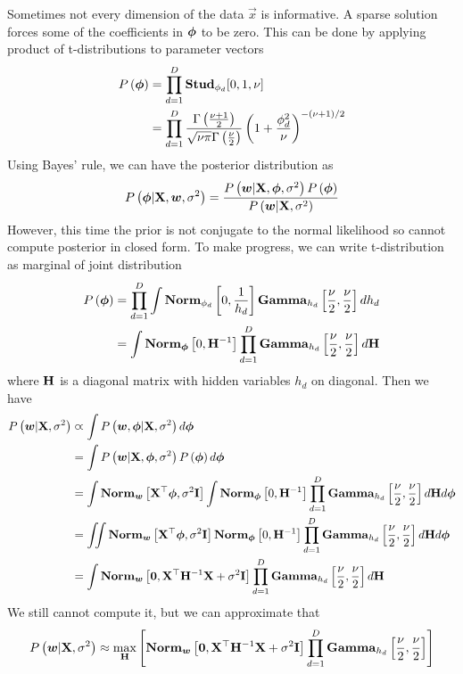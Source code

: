 Sometimes not every dimension of the data $\vec{x}$ is informative. A sparse solution forces some of the coefficients in $\boldsymbol{\phi}$ to be zero. This can be done by applying product of t-distributions to parameter vectors
\begin{align*}
	P\left(\boldsymbol{\phi}\right)&=\prod_{d=1}^D\mathbf{Stud}_{\phi_d}[0,1,\nu] \\
	&=\prod_{d=1}^D\frac{\Gamma\left(\frac{\nu+1}{2}\right)}{\sqrt{\nu\pi}\Gamma\left(\frac{\nu}{2}\right)}\left(1+\frac{\phi_d^2}{\nu}\right)^{-(\nu+1)/2}
\end{align*}
Using Bayes' rule, we can have the posterior distribution as
\begin{align*}
	P\left(\boldsymbol{\phi}|\mathbf{X},\boldsymbol{w},\sigma^2\right)=\frac{P\left(\boldsymbol{w}|\mathbf{X},\boldsymbol{\phi},\sigma^2\right)P\left(\boldsymbol{\phi}\right)}{P\left(\boldsymbol{w}|\mathbf{X},\sigma^2\right)}
\end{align*}
However, this time the prior is not conjugate to the normal likelihood so cannot compute posterior in closed form. To make progress, we can write t-distribution as marginal of joint distribution
\begin{align*}
	P\left(\boldsymbol{\phi}\right)&=\prod_{d=1}^D\int\mathbf{Norm}_{\phi_d}\left[0,\frac{1}{h_d}\right]\mathbf{Gamma}_{h_d}\left[\frac{\nu}{2},\frac{\nu}{2}\right]dh_d \\
	&=\int\mathbf{Norm}_{\boldsymbol{\phi}}\left[0,\mathbf{H}^{-1}\right]\prod_{d=1}^D\mathbf{Gamma}_{h_d}\left[\frac{\nu}{2},\frac{\nu}{2}\right]d\mathbf{H}
\end{align*}
where $\mathbf{H}$ is a diagonal matrix with hidden variables $h_d$ on diagonal. Then we have
\begin{align*}
	P\left(\boldsymbol{w}|\mathbf{X},\sigma^2\right)&\varpropto\int P\left(\boldsymbol{w},\boldsymbol{\phi}|\mathbf{X},\sigma^2\right)d\boldsymbol{\phi} \\
	&=\int P\left(\boldsymbol{w}|\mathbf{X},\boldsymbol{\phi},\sigma^2\right)P\left(\boldsymbol{\phi}\right)d\boldsymbol{\phi} \\
	&=\int\mathbf{Norm}_{\boldsymbol{w}}\left[\mathbf{X}^\top\boldsymbol{\phi},\sigma^2\mathbf{I}\right]\int\mathbf{Norm}_{\boldsymbol{\phi}}\left[0,\mathbf{H}^{-1}\right]\prod_{d=1}^D\mathbf{Gamma}_{h_d}\left[\frac{\nu}{2},\frac{\nu}{2}\right]d\mathbf{H}d\boldsymbol{\phi} \\
	&=\iint\mathbf{Norm}_{\boldsymbol{w}}\left[\mathbf{X}^\top\boldsymbol{\phi},\sigma^2\mathbf{I}\right]\mathbf{Norm}_{\boldsymbol{\phi}}\left[0,\mathbf{H}^{-1}\right]\prod_{d=1}^D\mathbf{Gamma}_{h_d}\left[\frac{\nu}{2},\frac{\nu}{2}\right]d\mathbf{H}d\boldsymbol{\phi} \\
	&=\int\mathbf{Norm}_{\boldsymbol{w}}\left[\boldsymbol{0},\mathbf{X}^\top\mathbf{H}^{-1}\mathbf{X}+\sigma^2\mathbf{I}\right]\prod_{d=1}^D\mathbf{Gamma}_{h_d}\left[\frac{\nu}{2},\frac{\nu}{2}\right]d\mathbf{H}
\end{align*}
We still cannot compute it, but we can approximate that
\begin{align*}
	P\left(\boldsymbol{w}|\mathbf{X},\sigma^2\right)\approx\max_{\mathbf{H}}\left[\mathbf{Norm}_{\boldsymbol{w}}\left[\boldsymbol{0},\mathbf{X}^\top\mathbf{H}^{-1}\mathbf{X}+\sigma^2\mathbf{I}\right]\prod_{d=1}^D\mathbf{Gamma}_{h_d}\left[\frac{\nu}{2},\frac{\nu}{2}\right]\right]
\end{align*}
